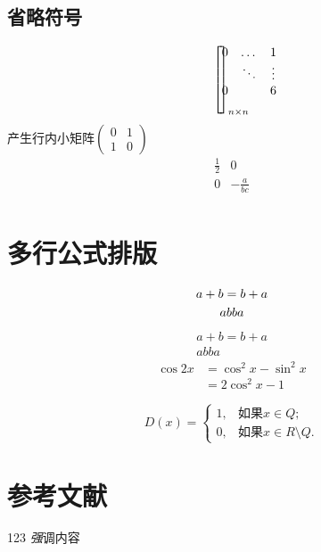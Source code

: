 \documentclass[10pt]{article} %
\begin{document}
	\subsection{省略符号} %
	$$
	\begin{bmatrix} %
	0 & \dots & 1 \\
	& \ddots & \vdots  \\
	0 & & 6 \\
	\hdotsfor{4} %
	\end{bmatrix}_{n \times n}
	$$
	产生行内小矩阵\begin{math}
		\left(\begin{smallmatrix} %
		0 & 1 \\1 & 0
		\end{smallmatrix}\right)
	\end{math}
	\[
	\begin{array}{r|r}
	\frac12 & 0\\
	\hline
	0 & -\frac a{bc} \\
	\end{array}
	\]
	\section{多行公式排版}
	\begin{gather}
		a+b=b+ a \notag\\ %
		ab ba
	\end{gather}
	\begin{gather*}
	a+b=b+ a\\
	ab ba
	\end{gather*}
	\begin{equation}
	\begin{split}
	\cos 2x &=\cos^2 x - \sin^2 x\\
	&=2\cos^2 x-1
	\end{split}
	\end{equation}
	
	\begin{equation}
		D(x) = \begin{cases}
		1, & \text{如果} x \in {Q}; \\
		0, & \text{如果} x \in {R} \setminus {Q}.
		\end{cases}
	\end{equation}
	\section{参考文献}
		\begin{thebibliography}{99}
			 123 \emph 强调内容
		\end{thebibliography}
		\cite{article1} %
		
\end{document}
